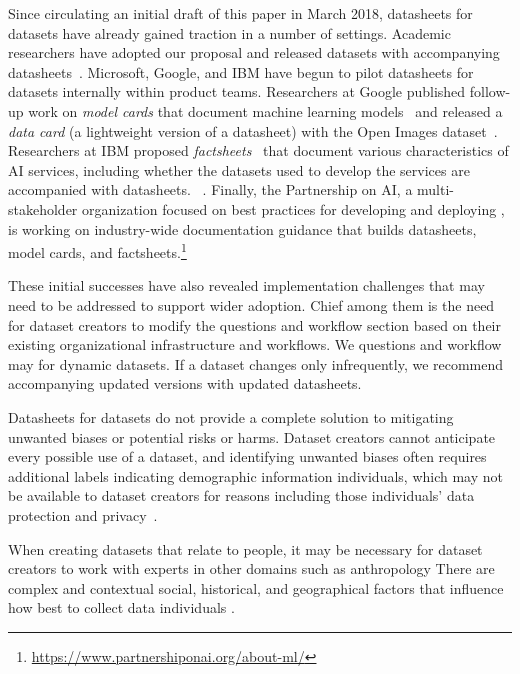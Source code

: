 Since circulating an initial draft of this paper in March 2018,
datasheets for datasets have already gained traction in a number of
settings. Academic researchers have adopted our proposal and released
datasets with accompanying datasheets~\cite[e.g.,][]{recipeqa2018,
dataset1, choi2018quac, daume20gicoref}. Microsoft, Google, and IBM
have begun to pilot datasheets for datasets internally within product
teams. Researchers at Google published follow-up work on \emph{model
cards} that document machine learning models~\cite{model_cards} and
released a \emph{data card} (a lightweight version of a datasheet)
 with the Open Images dataset~\cite{openimages}. Researchers at
IBM proposed \emph{factsheets}~\cite{factsheets} that document various
characteristics of AI services, including whether the datasets used to
develop the services are accompanied with datasheets. ~\cite{nutritionsecondgen}. Finally, the Partnership on AI, a
multi-stakeholder organization focused on  best practices for developing and deploying , is working on industry-wide documentation guidance that
builds  datasheets, model cards, and
factsheets.\footnote{\url{https://www.partnershiponai.org/about-ml/}}

These initial successes have also revealed implementation challenges
that may need to be addressed to support wider adoption. Chief among
them is the need for dataset creators to modify the questions and
workflow  section based on their existing
organizational infrastructure and workflows. We   questions and workflow
may   for dynamic datasets. If a dataset
changes only infrequently, we recommend accompanying updated versions
with updated datasheets.

Datasheets for datasets do not provide a complete solution to
mitigating unwanted  biases or potential risks or
harms. Dataset creators cannot anticipate every possible use of a
dataset, and identifying unwanted  biases often requires
additional labels indicating demographic information 
individuals, which may not be available to dataset creators for
reasons including those individuals' data protection and
privacy~\cite{holstein2018improving}.

When creating datasets that relate to people,  it may be necessary for dataset creators to
work with experts in other domains such as anthropology There are complex and contextual
social, historical, and geographical factors that influence how best
to collect data  individuals .

